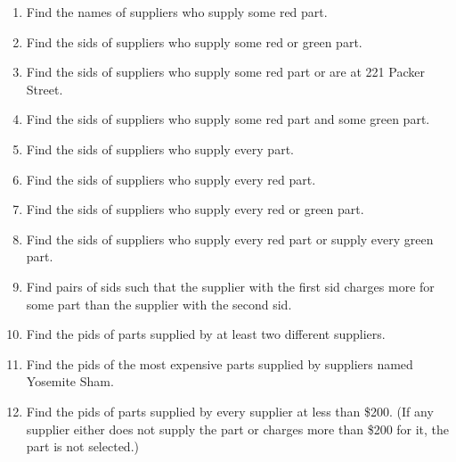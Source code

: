 \documentclass[12pt]{article}
\begin{document}
\begin{enumerate}
	\item Find the names of suppliers who supply some red part.
	\item Find the sids of suppliers who supply some red or green part.
	\item Find the sids of suppliers who supply some red part or are at 221 Packer Street. 
	\item Find the sids of suppliers who supply some red part and some green part. 
	\item Find the sids of suppliers who supply every part. 
	\item Find the sids of suppliers who supply every red part. 
	\item Find the sids of suppliers who supply every red or green part. 
	\item Find the sids of suppliers who supply every red part or supply every green part. 
	\item Find pairs of sids such that the supplier with the first sid charges more for some part than the supplier with the second sid. 
	\item Find the pids of parts supplied by at least two different suppliers. 
	\item Find the pids of the most expensive parts supplied by suppliers named Yosemite Sham. 
	\item Find the pids of parts supplied by every supplier at less than \$200. (If any supplier either does not supply the part or charges more than \$200 for it, the part is not selected.)
\end{enumerate}
\end{document}
